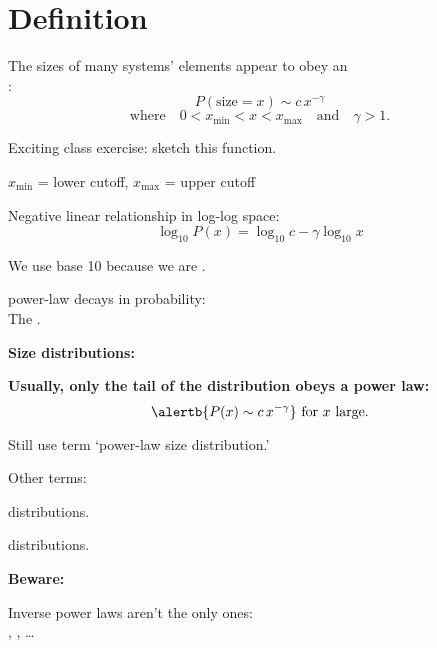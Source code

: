   

\section{Definition}

  
  
    The sizes of many systems' elements
    appear to obey an\\
    :
    $$P(\mbox{size}=x) \sim  c\, x^{-\gamma}$$
    $$
    \mbox{where} 
    \quad 
    0 < x_{\textrm{min}} < x < x_{\textrm{max}}
    \quad 
    \mbox{and} 
    \quad 
    \gamma > 1.
    $$
    
    
      Exciting class exercise: sketch this function.
    
  

  
    
    
      $x_{\textrm{min}}$ = lower cutoff, 
      $x_{\textrm{max}}$ = upper cutoff
    
      Negative linear relationship in log-log space:
      $$ \log_{10} P(x) = \log_{10} c - \gamma \log_{10} x $$
    
      We use base 10 because we are .
    
  

  
    
    
      power-law decays in probability:  \\
      The .
    
  


  \textbf{Size distributions:}

  \textbf{Usually, only the tail of the distribution obeys a power law:}
    $$\alertb{P(x) \sim  c\, x^{-\gamma}} \ \mbox{for}\ x \ \mbox{large}.$$
    
     
      Still use term `power-law size distribution.'
     
      Other terms: 
      
       
         distributions.
       
         distributions.
      
    

    \textbf{Beware:}
      
       Inverse power laws aren't the only ones:\\
          , 
          , \ldots
      
